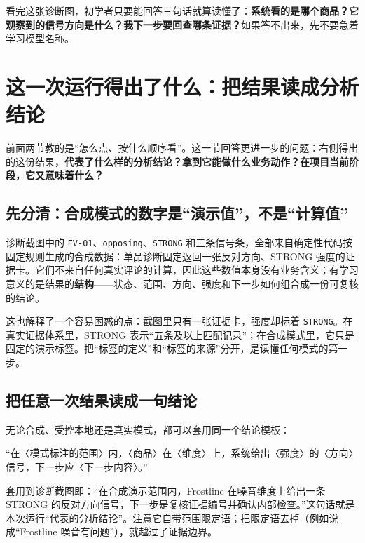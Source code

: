 \begin{beginnerbox}
看完这张诊断图，初学者只要能回答三句话就算读懂了：\textbf{系统看的是哪个商品？它观察到的信号方向是什么？我下一步要回查哪条证据？}如果答不出来，先不要急着学习模型名称。
\end{beginnerbox}

\section{这一次运行得出了什么：把结果读成分析结论}

前面两节教的是“怎么点、按什么顺序看”。这一节回答更进一步的问题：右侧得出的这份结果，\textbf{代表了什么样的分析结论？拿到它能做什么业务动作？在项目当前阶段，它又意味着什么？}

\subsection{先分清：合成模式的数字是“演示值”，不是“计算值”}

\begin{factbox}
诊断截图中的 \texttt{EV-01}、\texttt{opposing}、\texttt{STRONG} 和三条信号条，全部来自确定性代码按固定规则生成的合成数据：单品诊断固定返回一张反对方向、STRONG 强度的证据卡。它们不来自任何真实评论的计算，因此这些数值本身没有业务含义；有学习意义的是结果的\textbf{结构}——状态、范围、方向、强度和下一步如何组合成一份可复核的结论。
\end{factbox}

这也解释了一个容易困惑的点：截图里只有一张证据卡，强度却标着 \texttt{STRONG}。在真实证据体系里，STRONG 表示“五条及以上匹配记录”；在合成模式里，它只是固定的演示标签。把“标签的定义”和“标签的来源”分开，是读懂任何模式的第一步。

\subsection{把任意一次结果读成一句结论}

无论合成、受控本地还是真实模式，都可以套用同一个结论模板：

\begin{beginnerbox}
“在〈模式标注的范围〉内，〈商品〉在〈维度〉上，系统给出〈强度〉的〈方向〉信号，下一步应〈下一步内容〉。”

套用到诊断截图即：“在合成演示范围内，Frostline 在噪音维度上给出一条 STRONG 的反对方向信号，下一步是复核证据编号并确认内部检查。”这句话就是本次运行“代表的分析结论”。注意它自带范围限定语；把限定语去掉（例如说成“Frostline 噪音有问题”），就越过了证据边界。
\end{beginnerbox}

